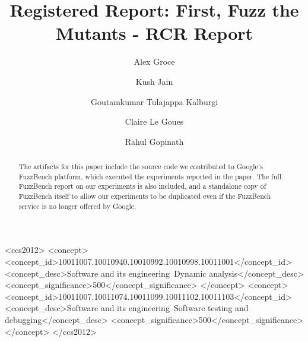 \documentclass[manuscript,screen,review]{acmart}
\author{Alex Groce}
\affiliation{\institution{Northern Arizona University}\country{United States}}
\author{Kush Jain}
\affiliation{\institution{Carnegie Mellon University}\country{United States}}
\author{Goutamkumar Tulajappa Kalburgi}
\affiliation{\institution{Northern Arizona University}\country{United States}}
\author{Claire Le Goues}
\affiliation{\institution{Carnegie Mellon University}\country{United States}}
\author{Rahul Gopinath}
\affiliation{\institution{University of Sydney}\country{Australia}}
\begin{document}
\title{Registered Report: First, Fuzz the Mutants - RCR Report}


\renewcommand{\shortauthors}{Groce et al.}

\begin{abstract}
The artifacts for this paper include the source code we contributed to
Google's FuzzBench platform, which executed the experiments reported
in the paper.  The full FuzzBench report on our experiments is also
included, and a standalone copy of FuzzBench itself to allow our
experiments to be duplicated even if the FuzzBench service is no
longer offered by Google.
\end{abstract}


\begin{CCSXML}
<ccs2012>
<concept>
<concept_id>10011007.10010940.10010992.10010998.10011001</concept_id>
<concept_desc>Software and its engineering~Dynamic analysis</concept_desc>
<concept_significance>500</concept_significance>
</concept>
<concept>
<concept_id>10011007.10011074.10011099.10011102.10011103</concept_id>
<concept_desc>Software and its engineering~Software testing and debugging</concept_desc>
<concept_significance>500</concept_significance>
</concept>
</ccs2012>
\end{CCSXML}



\maketitle
\end{document}
